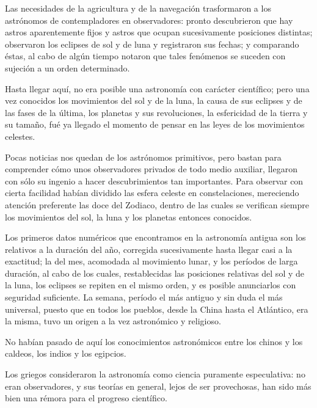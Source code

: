\documentclass[a4paper, 12pt]{article}
\begin{document}
Las necesidades de la agricultura y de la navegación trasformaron a los astrónomos de contempladores en observadores: pronto descubrieron que hay astros aparentemente fijos y astros que ocupan sucesivamente posiciones distintas; observaron los eclipses de sol y de luna y registraron sus fechas; y comparando éstas, al cabo de algún tiempo notaron que tales fenómenos se suceden con sujeción a un orden determinado.

Hasta llegar aquí, no era posible una astronomía con carácter científico; pero una vez conocidos los movimientos del sol y de la luna, la causa de sus eclipses y de las fases de la última, los planetas y sus revoluciones, la esfericidad de la tierra y su tamaño, fué ya llegado el momento de pensar en las leyes de los movimientos celestes.

Pocas noticias nos quedan de los astrónomos primitivos, pero bastan para comprender cómo unos observadores privados de todo medio auxiliar, llegaron con sólo su ingenio a hacer descubrimientos tan importantes. Para observar con  cierta facilidad habían dividido las esfera celeste en constelaciones, mereciendo atención preferente las doce del Zodiaco, dentro de las cuales se verifican siempre los movimientos del sol, la luna y los planetas entonces conocidos.

Los primeros datos numéricos que encontramos en la astronomía antigua son los relativos a la duración del año, corregida sucesivamente hasta llegar casi a la exactitud; la del mes, acomodada al movimiento lunar, y los períodos de larga duración, al cabo de los cuales, restablecidas las posiciones relativas del sol y de la luna, los eclipses se repiten en el mismo orden, y es posible anunciarlos con seguridad suficiente. La semana, período el más antiguo y sin duda el más universal, puesto que en todos los pueblos, desde la China hasta el Atlántico, era la misma, tuvo un origen a la vez astronómico y religioso.

No habían pasado de aquí los conocimientos astronómicos entre los chinos y los caldeos, los indios y los egipcios.

Los griegos consideraron la astronomía como ciencia puramente especulativa: no eran observadores, y sus teorías en general, lejos de ser provechosas, han sido más bien una rémora para el progreso científico.
\end{document}
